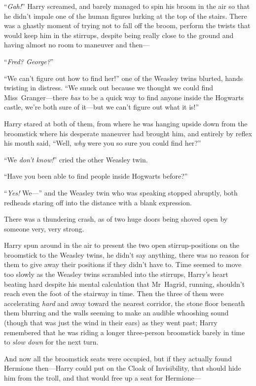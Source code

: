 “\emph{Gah!}” Harry screamed, and barely managed to spin his broom in the air
so that he didn’t impale one of the human figures lurking at the top of the
stairs. There was a ghastly moment of trying not to fall off the broom, perform
the twists that would keep him in the stirrups, despite being really close to
the ground and having almost no room to maneuver and then—

“\emph{Fred? George?}”

“We can’t figure out how to find her!” one of the Weasley twins blurted, hands
twisting in distress. “We snuck out because we thought we could find
Miss~Granger—there \emph{has} to be a quick way to find anyone inside the Hogwarts
castle, we’re both sure of it—but we can’t figure out what it is!”

Harry stared at both of them, from where he was hanging upside down from the
broomstick where his desperate maneuver had brought him, and entirely by reflex
his mouth said, “Well, \emph{why} were you so sure you could find her?”

“We \emph{don’t know!}” cried the other Weasley twin.

“Have you been able to find people inside Hogwarts before?”

“\emph{Yes!} We—” and the Weasley twin who was speaking stopped abruptly,
both redheads staring off into the distance with a blank expression.

There was a thundering crash, as of two huge doors being shoved open by someone
very, very strong.

Harry spun around in the air to present the two open stirrup-positions on the
broomstick to the Weasley twins, he didn’t say anything, there was no reason
for them to give away their positions if they didn’t have to. Time seemed to
move too slowly as the Weasley twins scrambled into the stirrups, Harry’s heart
beating hard despite his mental calculation that Mr~Hagrid, running, shouldn’t
reach even the foot of the stairway in time. Then the three of them were
accelerating \emph{hard} and away toward the nearest corridor, the stone floor
beneath them blurring and the walls seeming to make an audible whooshing sound
(though that was just the wind in their ears) as they went past; Harry
remembered that he was riding a longer three-person broomstick barely in time
to \emph{slow down} for the next turn.

And now all the broomstick seats were occupied, but if they actually found
Hermione then—Harry could put on the Cloak of Invisibility, that should hide
him from the troll, and that would free up a seat for Hermione—

